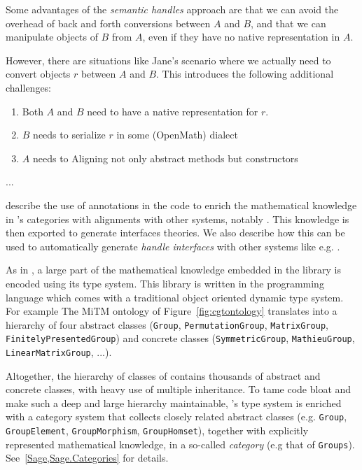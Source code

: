 Some advantages of the \emph{semantic handles} approach are that we
can avoid the overhead of back and forth conversions between $A$ and
$B$, and that we can manipulate objects of $B$ from $A$, even if they
have no native representation in $A$.

However, there are situations like Jane's scenario where we actually
need to convert objects $r$ between $A$ and $B$. This introduces the
following additional challenges:
\begin{enumerate}
\item Both $A$ and $B$ need to have a native representation for $r$.
\item $B$ needs to serialize $r$ in some (OpenMath) dialect
\item $A$ needs to 
  Aligning not only abstract methods but constructors
\end{enumerate}

...




describe the use of annotations in the code to enrich the
mathematical knowledge in \Sage's categories with alignments with other systems, notably
\MMT. This knowledge is then exported to generate interfaces theories. We also describe how
this can be used to automatically generate \emph{handle interfaces} with other systems
like e.g. \GAP.



As in \GAP, a large part of the mathematical knowledge embedded in the
\Sage library is encoded using its type system. This library is
written in the \Python programming language which comes with a
traditional object oriented dynamic type system.
For example The MiTM ontology of Figure~\ref{fig:cgtontology}
translates into a hierarchy of four abstract classes (\texttt{Group},
\texttt{PermutationGroup}, \texttt{MatrixGroup},
\texttt{FinitelyPresentedGroup}) and concrete classes
(\texttt{SymmetricGroup}, \texttt{MathieuGroup},
\texttt{LinearMatrixGroup}, ...).

Altogether, the hierarchy of classes of \Sage contains thousands of
abstract and concrete classes, with heavy use of multiple inheritance.
To tame code bloat and make such a deep and large hierarchy
maintainable, \Python's type system is enriched with a category system
that collects closely related abstract classes (e.g. \texttt{Group},
\texttt{GroupElement}, \texttt{GroupMorphism}, \texttt{GroupHomset}),
together with explicitly represented mathematical knowledge, in a
so-called \emph{category} (e.g that of \texttt{Groups}).
See~\ref{Sage,Sage.Categories} for details.

